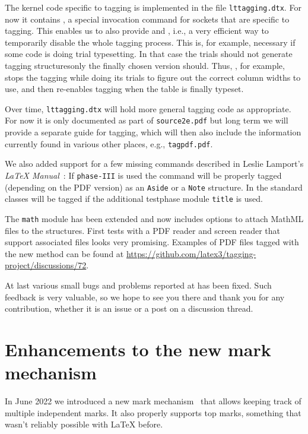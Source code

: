 \documentclass{ltnews}
\providecommand\Dash {\unskip \textemdash}
\begin{document}
The kernel code specific to tagging is implemented in the file
\texttt{lttagging.dtx}. For now it contains , a
special invocation command for sockets that are specific to
tagging. This enables us to also provide  and
, i.e., a very efficient way to temporarily disable
the whole tagging process. This is, for example, necessary if some
code is doing trial typesetting. In that case the trials should not
generate tagging structures\Dash only the finally chosen version
should. Thus, , for example, stops the tagging while
doing its trials to figure out the correct column widths to use, and
then re-enables tagging when the table is finally typeset.

Over time, \texttt{lttagging.dtx} will hold more general tagging code
as appropriate. For now it is only documented as part of
\texttt{source2e.pdf} but long term we will provide a separate guide
for tagging, which will then also include the information currently
found in various other places, e.g., \texttt{tagpdf.pdf}.

We also added support for a few missing commands
described in Leslie Lamport's \emph{\LaTeX{}
Manual}~\cite{39:Lamport}: If \texttt{phase-III} is used
the  command will be properly tagged (depending on
the PDF version) as an \texttt{Aside} or a \texttt{Note} structure.
In the standard classes  will be tagged if the additional
testphase module \texttt{title} is used.

The \texttt{math} module has been extended and now includes
options to attach MathML files to the structures.
First tests with a PDF reader and screen reader that support
associated files looks very promising. Examples of PDF files tagged with the 
new method can be found at 
\url{https://github.com/latex3/tagging-project/discussions/72}.

At last various small bugs and problems reported at
has been fixed.
Such feedback is very valuable,
so we hope to see you there and thank you for
any contribution, whether it is an issue or a post on a discussion
thread.



\section{Enhancements to the new mark mechanism}

In June 2022 we introduced a new mark mechanism~\cite[p.~76]{39:ltnews} that allows keeping track of multiple
independent marks. It also properly supports top marks, something that wasn't
reliably possible with \LaTeX{} before.
\end{document}
